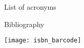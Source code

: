 \documentclass[11pt,fleqn,letterpaper,twoside,openany]{boek3}
\begin{document}
 {List of acronyms}

\begin{multicols}{2}
\begin{description}

\end{description}
\end{multicols}

 {Bibliography}





\hbox{}\vfill
\texttt{[image: isbn\_barcode]}

\closeout\chapterlist

\end{document}
